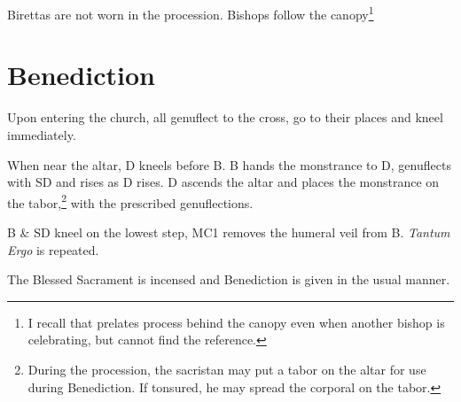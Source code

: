 \documentclass[letterpaper]{report}
\begin{document}
{\rubric Birettas are not worn in the procession. Bishops follow the
canopy\footnote{I recall that prelates process behind the canopy even when
another bishop is celebrating, but cannot find the reference.}

\section{Benediction}

\rubric Upon entering the church, all genuflect to the cross, go to their
places and kneel immediately.

\rubric When near the altar, D kneels before B. B hands the monstrance to D,
genuflects with SD and rises as D rises. D ascends the altar and places the
monstrance on the tabor,\footnote{During the procession, the sacristan may put
    a tabor on the altar for use during Benediction. If tonsured, he may spread
    the corporal on the tabor.} with the prescribed genuflections.

\rubric B \& SD kneel on the lowest step, MC1 removes the humeral veil from
B. \textit{Tantum Ergo} is repeated.

\rubric The Blessed Sacrament is incensed and Benediction is given in the usual
manner.

}


\printbibliography
\end{document}
